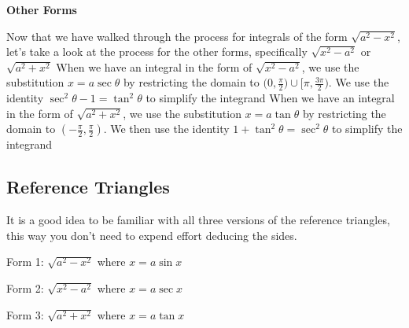 \documentclass{report}
\begin{document}
   \bigbreak \noindent 
   \begin{large}
       \textbf{Other Forms}
   \end{large}
   \bigbreak \noindent 
   Now that we have walked through the process for integrals of the form $\sqrt{a^{2} - x^{2}}$, let's take a look at the process for the other forms, specifically $\sqrt{x^{2} - a^{2}}$ or $\sqrt{a^{2} + x^{2}}$
   \bigbreak \noindent 
   When we have an integral in the form of $\sqrt{x^{2} - a^{2}}$, we use the substitution $x=a\sec{\theta }$ by restricting the domain to $\bigg(0,\frac{\pi}{2}\bigg)\cup \bigg[\pi, \frac{3\pi}{2}\bigg) $. We use the identity  $\sec^{2}{\theta } - 1 = \tan^{2}{\theta } $ to simplify the integrand
   \bigbreak \noindent 
   When we have  an integral in the form of $\sqrt{a^{2} + x^{2}}$, we use the substitution $x=a\tan{\theta }$ by restricting the domain to $\left(-\frac{\pi}{2}, \frac{\pi}{2}\right) $. We then use the identity $1+\tan^{2}{\theta } = \sec^{2}{\theta }$ to simplify the integrand
   
   \bigbreak \noindent 

   \pagebreak 
   \subsection*{Reference Triangles}
   \bigbreak \noindent 
   It is a good idea to be familiar with all three versions of the reference triangles, this way you don't need to expend effort deducing the sides.
   \bigbreak \noindent 
   \begin{minipage}[]{0.47\textwidth}
       Form 1: $\sqrt{a^{2} - x^{2}}$ where $x=a\sin{x}$
       \bigbreak \noindent 
   \end{minipage}
   \begin{minipage}[]{0.47\textwidth}
        Form 2: $\sqrt{x^{2} - a^{2}}$ where $x=a\sec{x}$
        \bigbreak \noindent 
   \end{minipage}
   \bigbreak \noindent 
   Form 3: $\sqrt{a^{2} + x^{2}}$ where $x=a\tan{x}$
   \bigbreak \noindent 
\begin{figure}[ht]
    \centering
    \label{fig:tri4}
\end{figure}





    


        

        


        
        

    
    
    
\end{document}
